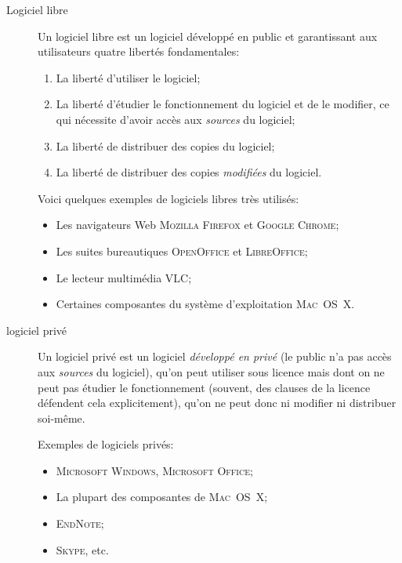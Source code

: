 \documentclass{article}
\newcommand\entite[1]{{\textsc{#1}}}
\begin{document}
\begin{description}

\item[Logiciel libre] Un logiciel libre est un logiciel développé en public et garantissant aux utilisateurs quatre libertés fondamentales:

\begin{enumerate}
\item La liberté d’utiliser le logiciel;
\item La liberté d’étudier le fonctionnement du logiciel et de le modifier, ce qui nécessite d’avoir accès aux \emph{sources} du logiciel;
\item La liberté de distribuer des copies du logiciel;
\item La liberté de distribuer des copies \emph{modifiées} du logiciel.
\end{enumerate}

Voici quelques exemples de logiciels libres très utilisés:

\begin{itemize}
\item Les navigateurs Web \entite{Mozilla Firefox} et \entite{Google Chrome};
\item Les suites bureautiques \entite{OpenOffice} et \entite{LibreOffice};
\item Le lecteur multimédia \entite{VLC};
\item Certaines composantes du système d’exploitation \entite{Mac~OS~X}.
\end{itemize}

\item[logiciel privé] Un logiciel privé est un logiciel \emph{développé en privé} (le public n’a pas accès aux \emph{sources} du logiciel), qu’on peut utiliser sous licence mais dont on ne peut pas étudier le fonctionnement (souvent, des clauses de la licence défendent cela explicitement), qu’on ne peut donc ni modifier ni distribuer soi-même.

Exemples de logiciels privés:

\begin{itemize}
\item \entite{Microsoft Windows}, \entite{Microsoft Office};
\item La plupart des composantes de \entite{Mac~OS~X};
\item \entite{EndNote};
\item \entite{Skype}, etc.
\end{itemize}

\end{description}
\end{document}

